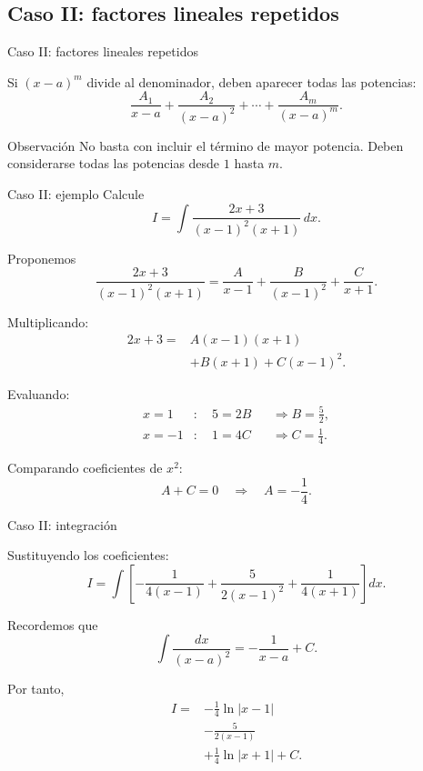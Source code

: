 \documentclass[10pt,aspectratio=169]{beamer}
\begin{document}
\subsection{Caso II: factores lineales repetidos}

\begin{frame}{Caso II: factores lineales repetidos}
\small

Si $(x-a)^m$ divide al denominador,
deben aparecer todas las potencias:
\[
\boxed{
\frac{A_1}{x-a}
+\frac{A_2}{(x-a)^2}
+\cdots+
\frac{A_m}{(x-a)^m}.
}
\]

\begin{alertblock}{Observación}
No basta con incluir el término de mayor
potencia. Deben considerarse todas las
potencias desde $1$ hasta $m$.
\end{alertblock}
\end{frame}

\begin{frame}{Caso II: ejemplo}
\small
Calcule
\[
I=\int\frac{2x+3}{(x-1)^2(x+1)}\,dx.
\]

Proponemos
\[
\frac{2x+3}{(x-1)^2(x+1)}
=
\frac{A}{x-1}
+\frac{B}{(x-1)^2}
+\frac{C}{x+1}.
\]

Multiplicando:
\[
\begin{aligned}
2x+3={}&A(x-1)(x+1)\\
&+B(x+1)+C(x-1)^2.
\end{aligned}
\]

Evaluando:
\[
\begin{aligned}
x=1 &: \quad 5=2B
&&\Rightarrow B=\frac52,\\
x=-1 &: \quad 1=4C
&&\Rightarrow C=\frac14.
\end{aligned}
\]

Comparando coeficientes de $x^2$:
\[
A+C=0
\quad\Rightarrow\quad A=-\frac14.
\]
\end{frame}

\begin{frame}{Caso II: integración}
\small

Sustituyendo los coeficientes:
\[
I=\int\left[
-\frac1{4(x-1)}
+\frac5{2(x-1)^2}
+\frac1{4(x+1)}
\right]dx.
\]

Recordemos que
\[
\int\frac{dx}{(x-a)^2}
=-\frac1{x-a}+C.
\]

Por tanto,
\[
\boxed{
\begin{aligned}
I={}&-\frac14\ln|x-1|\\
&-\frac5{2(x-1)}\\
&+\frac14\ln|x+1|+C.
\end{aligned}
}
\]
\end{frame}
\end{document}
